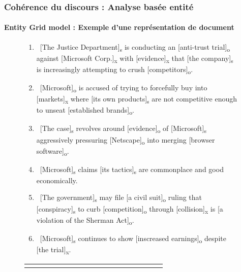 \documentclass[xcolor=table]{beamer}
\begin{document}
\begin{frame}
	\frametitle{Cohérence du discours : Analyse basée entité}
	\framesubtitle{Entity Grid model : Exemple d'une représentation de document}
	
	\begin{figure}
		\centering\tiny\bfseries
		\begin{minipage}{.8\textwidth}
			\begin{enumerate}
				\item\ [The Justice Department]\textsubscript{s} is conducting an [anti-trust trial]\textsubscript{o} against [Microsoft Corp.]\textsubscript{x} with [evidence]\textsubscript{x} that [the company]\textsubscript{s} is increasingly attempting to crush [competitors]\textsubscript{o}.
				\item\ [Microsoft]\textsubscript{o} is accused of trying to forcefully buy into [markets]\textsubscript{x} where [its own products]\textsubscript{s} are not competitive enough to unseat [established brands]\textsubscript{o}.
				\item\ [The case]\textsubscript{s} revolves around [evidence]\textsubscript{o} of [Microsoft]\textsubscript{s} aggressively pressuring [Netscape]\textsubscript{o} into merging [browser software]\textsubscript{o}.
				\item\ [Microsoft]\textsubscript{s} claims [its tactics]\textsubscript{s} are commonplace and good economically.
				\item\ [The government]\textsubscript{s} may file [a civil suit]\textsubscript{o} ruling that [conspiracy]\textsubscript{s} to curb [competition]\textsubscript{o} through [collision]\textsubscript{x} is [a violation of the Sherman Act]\textsubscript{o}.
				\item\ [Microsoft]\textsubscript{s} continues to show [inscreased earnings]\textsubscript{o} despite [the trial]\textsubscript{x}.
			\end{enumerate}
		\end{minipage}
		
		\color{blue}
		\begin{tabular}{ccccccccccccccccc}
			& \rotatebox[origin=c]{90}{Department} & \rotatebox[origin=c]{90}{Trial} & \rotatebox[origin=c]{90}{Microsoft} &
			\rotatebox[origin=c]{90}{Evidence} & \rotatebox[origin=c]{90}{Competitors} & \rotatebox[origin=c]{90}{Markets} &
			\rotatebox[origin=c]{90}{Products} & \rotatebox[origin=c]{90}{Brands} & \rotatebox[origin=c]{90}{Case} &
			\rotatebox[origin=c]{90}{Netscape} & \rotatebox[origin=c]{90}{Software} & \rotatebox[origin=c]{90}{Tactics} &
			\rotatebox[origin=c]{90}{Government} & \rotatebox[origin=c]{90}{Suit} & \rotatebox[origin=c]{90}{Earnings} & \\
			

\end{tabular}
\end{figure}
\end{frame}
\end{document}

